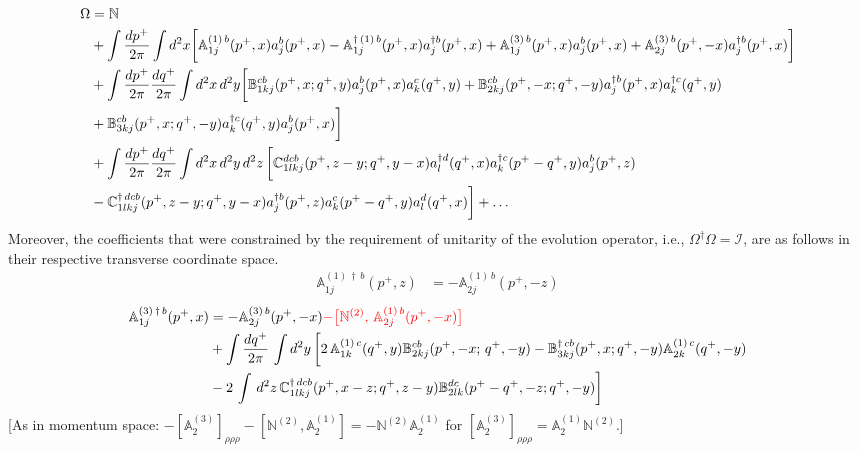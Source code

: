 \documentclass[aps,prd,amsmath,amssymb,nofootinbib]{revtex4-2}
\def\mf#1{\mathbb{#1}}
\numberwithin{equation}{section}
\begin{document}
\begin{align}
    \Omega & = \mf{N} \notag \\ & +
                \int \frac{d p^+}{2\pi} 
             \int d^2 x  
                \bigg[\mf{A}^{(1)\, b}_{1j}(p^{+},x)a^{b}_{j}(p^{+},x) 
                -  \mf{A}^{\dagger\, (1)\, b}_{1j} (p^{+},x) a^{\dagger b}_{j}(p^{+},x)+ \mf{A}^{(3)\, b}_{1j}(p^{+},x)a^{b}_{j}(p^{+},x) 
                +  \mf{A}^{(3)\, b}_{2j} (p^{+},-x) a^{\dagger b}_{j}(p^{+},x)\bigg] \notag \\ & 
               +\int \frac{d p^+}{2\pi} \frac{d q^+}{2\pi} \int d^2x\, d^2y  
               \bigg[\mf{B}^{cb}_{1kj}(p^{+}, x;q^{+}, y) a^{b}_{j}(p^{+},x)a^{c}_{k}(q^{+},y) 
                   + \mf{B}^{cb}_{2kj}(p^{+},-x; q^{+},-y) a^{\dagger b}_{j}(p^{+},x)a^{\dagger c}_{k}(q^{+},y)
            \notag \\ & 
                  + \mf{B}^{cb}_{3kj} (p^{+},x; q^{+}, -y) a^{\dagger c}_{k}(q^{+},y)a^{b}_{j}(p^{+},x)\bigg] \notag \\ & 
               + \int 
               \frac{d p^+}{2\pi} \frac{dq^+}{2\pi} 
               \int d^2x\, d^2y\,  d^2 z\, 
               \bigg[\mf{C}^{ dcb}_{1lkj}(p^{+},z-y; q^{+},y-x) a^{\dagger d}_{l}(q^{+},x)  a^{\dagger c}_{k}(p^{+}-q^{+}, y)  a^{b}_{j}(p^{+},z)
               \notag \\ & 
               -  \mf{C}^{\dagger\, dcb}_{1lkj}(p^{+},z-y; q^{+}, y-x) a^{\dagger b}_{j}(p^{+},z) a^{c}_{k}(p^{+}-q^{+},y) a^{d}_{l}(q^{+},x)\bigg] + \ldots
\end{align}
Moreover, the coefficients that were constrained by the requirement of unitarity of the evolution operator, i.e., $\Omega^{\dagger}\Omega = \mathcal{I}$, are as follows in their respective transverse coordinate space. 
\begin{align}
    \mf{A}^{(1)\, \dagger\,  b}_{1j}(p^{+},z) & =  -\mf{A}^{(1)\, b}_{2j}(p^{+},-z)
\end{align}
\begin{align}
 \mf{A}^{(3)\, \dagger\, b}_{1j}(p^{+},x) & = -\mf{A}^{(3)\, b}_{2j}(p^{+}, -x) {\color{red}-\big[\mf{N}^{(2)},\,\mf{A}^{(1)\, b}_{2j}(p^{+},-x)\big]}\notag \\ & +\int \frac{dq^{+}}{2\pi}\, \int d^{2}y\, \bigg[2\, \mf{A}^{(1)\, c}_{1k}(q^{+}, y)\mf{B}^{cb}_{2kj}(p^{+}, -x;\, q^{+},-y)-\mf{B}^{\dagger\, cb}_{3kj}(p^{+}, x; q^{+}, -y)\mf{A}^{(1)\,c}_{2k}(q^{+},-y)\notag \\ & -2\,\int\, d^{2}z\, \mf{C}^{\dagger\, dcb}_{1lkj}(p^{+},x-z; q^{+},z-y)\mf{B}^{dc}_{2lk}(p^{+}-q^{+},-z; q^{+},-y)\bigg]
\end{align} {\color{red}[As in momentum space: $-[\mf{A}^{(3)}_2]_{\rho\rho\rho}-[\mf{N}^{(2)},\mf{A}^{(1)}_2]=-\mf{N}^{(2)}\mf{A}^{(1)}_2$ for $[\mf{A}^{(3)}_2]_{\rho\rho\rho}=\mf{A}^{(1)}_2\mf{N}^{(2)}$.]}\par\noindent
\end{document}
